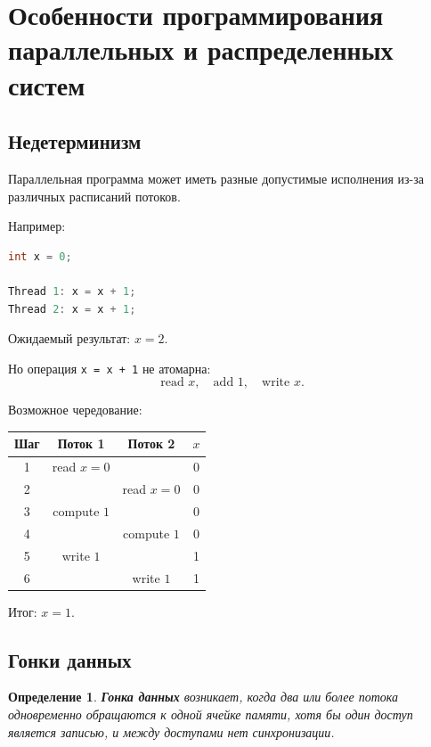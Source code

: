 \documentclass[12pt,a4paper]{article}
\newtheorem{definition}{Определение}
\begin{document}
\section{Особенности программирования параллельных и распределенных систем}

\subsection{Недетерминизм}

Параллельная программа может иметь разные допустимые исполнения из-за различных расписаний потоков.

Например:

\begin{lstlisting}[language=C]
int x = 0;

Thread 1: x = x + 1;
Thread 2: x = x + 1;
\end{lstlisting}

Ожидаемый результат: $x = 2$.

Но операция \texttt{x = x + 1} не атомарна:
\[
\text{read } x,\quad \text{add } 1,\quad \text{write } x.
\]

Возможное чередование:

\begin{center}
\begin{tabular}{cccc}
\toprule
Шаг & Поток 1 & Поток 2 & $x$ \\
\midrule
1 & read $x=0$ & & 0 \\
2 & & read $x=0$ & 0 \\
3 & compute $1$ & & 0 \\
4 & & compute $1$ & 0 \\
5 & write $1$ & & 1 \\
6 & & write $1$ & 1 \\
\bottomrule
\end{tabular}
\end{center}

Итог: $x = 1$.

\subsection{Гонки данных}

\begin{definition}
\textbf{Гонка данных} возникает, когда два или более потока одновременно обращаются к одной ячейке памяти, хотя бы один доступ является записью, и между доступами нет синхронизации.
\end{definition}
\end{document}
